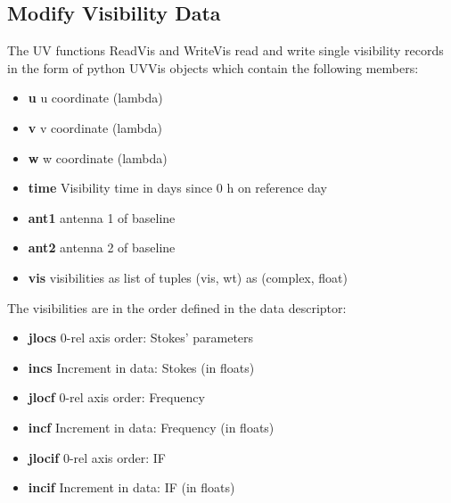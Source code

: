 \documentclass[11pt]{report}
\begin{document}
\subsection{Modify Visibility Data}
The UV functions ReadVis and WriteVis read and write single visibility
records in the form of python UVVis objects which contain the
following members:
\begin{itemize}
\item {\bf u}    u coordinate (lambda)
\item {\bf v}    v coordinate (lambda)
\item {\bf w}    w coordinate (lambda)
\item {\bf time} Visibility time in days since 0 h on reference day
\item {\bf ant1} antenna 1 of baseline
\item {\bf ant2} antenna 2 of baseline
\item {\bf vis } visibilities as list of tuples (vis, wt) as (complex, float)
\end{itemize}

The visibilities are in the order defined in the data descriptor:
\begin{itemize}
\item {\bf jlocs} 0-rel axis order: Stokes' parameters
\item {\bf incs} Increment in data: Stokes (in floats)
\item {\bf jlocf} 0-rel axis order: Frequency
\item {\bf incf} Increment in data: Frequency (in floats)
\item {\bf jlocif} 0-rel axis order: IF
\item {\bf incif} Increment in data: IF (in floats)
\end{itemize}
\end{document}
